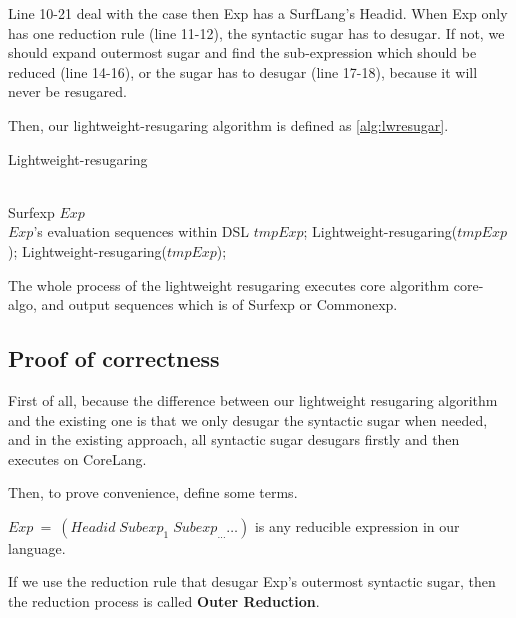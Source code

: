 Line 10-21 deal with the case then Exp has a SurfLang's Headid. When Exp only has one reduction rule (line 11-12), the syntactic sugar has to desugar. If not, we should expand outermost sugar and find the sub-expression which should be reduced (line 14-16), or the sugar has to desugar (line 17-18), because it will never be resugared.


Then, our lightweight-resugaring algorithm is defined as \ref{alg:lwresugar}.

\begin{algorithm}
	\caption{Lightweight-resugaring}
	\label{alg:lwresugar}     %
	\begin{algorithmic}[1]       %
		\REQUIRE ~~\\      %
		Surfexp $Exp$
		\ENSURE ~~\\     %
		$Exp$'s evaluation sequences within DSL
		\RETURN
		\PRINT $tmpExp$;
		\STATE Lightweight-resugaring($tmpExp$);
		\ELSE 
		\STATE Lightweight-resugaring($tmpExp$);
		\ENDIF
		\ENDWHILE
		
	\end{algorithmic}
\end{algorithm}

The whole process of the lightweight resugaring executes core algorithm core-algo, and output sequences which is of Surfexp or Commonexp.

\subsection{Proof of correctness}

First of all, because the difference between our lightweight resugaring algorithm and the existing one is that we only desugar the syntactic sugar when needed, and in the existing approach, all syntactic sugar desugars firstly and then executes on CoreLang.

Then, to prove convenience, define some terms.

$Exp~=~(Headid\;Subexp_{1}\;Subexp_{\ldots} \ldots)$ is any reducible expression in our language.

If we use the reduction rule that desugar Exp's outermost syntactic sugar, then the reduction process is called {\bfseries Outer Reduction}.

